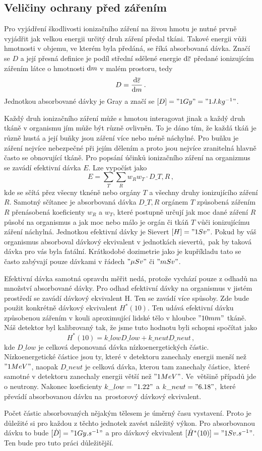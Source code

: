 \documentclass[11pt,a4paper]{article}
\begin{document}
\subsection*{Veličiny ochrany před zářením}
Pro vyjádření škodlivosti ionizačního záření na živou hmotu je nutné
prvně vyjádřit jak velkou energii určitý druh záření předal tkáni.
Takové energii vůži hmotnosti v objemu, ve kterém byla předáná, se říká
absorbovaná dávka. Značí se $ D $ a její přesná definice je podíl střední
sdělené energie $\mathrm{d} \overline{\varepsilon}$ předané ionizujícím zářením
látce o hmotnosti $\mathrm{d} m$ v malém prostoru, tedy
$$D=\frac{\mathrm{d} \overline{\varepsilon}}{\mathrm{d} m}\,.$$
Jednotkou absorbované dávky je Gray a značí se ${[D]="1 Gy"="1 J.kg^{-1}"}$.\par
Každý druh ionizačního záření může s hmotou interagovat jinak a každý druh tkáně
v organismu jím může být různě ovlivněn. To je dáno tím, že každá tkáň je různě
hustá a její buňky jsou záření více nebo méně náchylné. Pro buňku je záření
nejvíce nebezpečné při jejím dělením a proto jsou nejvíce zranitelná hlavně
často se obnovující tkáně. Pro popsání účinků ionizačního záření na organizmus
se zavádí efektivní dávka $E$. Lze vypočíst jako
$$E=\sum_{T}\sum_{R} w_R w_T\cdot D\_{T,R}\,,$$
kde se sčítá přez všecny tknéně nebo orgány $T$ a všechny druhy ionizujícího
záření $R$. Samotný sčítanec je absorbovaná dávka $D\_{T,R}$ orgánem $T$
způsobená zářením $R$ přenásobená koeficienty $w_R$ a $w_T$, které postupně
určují jak moc dané záření $R$ působí na organismus a jak moc nebo málo je
orgán či tkáň $T$ vůči ionizujícímu záření náchylná. Jednotkou efektivní dávky
je Sievert ${[H]="1 Sv"}$. Pokud by váš organismus absorboval dávkový ekvivalent
v jednotkách sievertů,~pak by taková dávka pro vás byla fatální. Krátkodobé
dozimetrie jako je kupříkladu tato se často zabývají pouze dávkami v řádech
$ "\mu Sv" $ či $ "mSv" $.\par
Efektivní dávka samotná opravdu měřit nedá, protože vychází pouze z odhadů na
množství absorbované dávky. Pro odhad efektivní dávky na organismus v jistém
prostředí se zavádí dávkový ekvivalent H. Ten se zavádí více spůsoby. Zde
bude použit konkrétně dávkový ekvivalent $ H^\ast(10) $. Ten udává efektivní
dávku způsobenou zářením v kouli aproximující lidské tělo v hloubce
$"10 mm"$ tkáně. Náš detektor byl kalibrovaný tak, že jsme tuto hodnotu byli
schopni spočítat jako
$$H^\ast(10)=k\_{low}D\_{low}+k\_{neut}D\_{neut}\,,$$
kde $D\_{low}$ je celková deponovaná dávka nízkoenergetických částic.
Nízkoenergetické částice jsou ty, které v detektoru zanechaly energii menší než
$ "1 MeV" $, naopak $ D\_{neut} $ je celková dávka, kterou tam zanechaly
částice,~které samotné v detektoru zanechaly energii větší než $ "1 MeV" $.
Ve~většině případů jde o neutrony. Nakonec koeficienty
$ k\_{low}="1.22" $ a $ k\_{neut}="6.18" $,~které převádí absorbovanou dávku
na~prostorový dávkový ekvivalent.\par
Počet částic absorbovaných nějakým tělesem je úměrný času vystavení. Proto je
důležité si pro každou z těchto jednotek zavést náležitý výkon. Pro absorbovanou
dávku to bude $ [\dot{D}]="1 Gy.s^{-1}" $ a pro dávkový ekvivalent
$ [\dot{H}^\ast(10)]="1 Sv.s^{-1}" $. Ten bude pro tuto práci důležitější.
\end{document}
